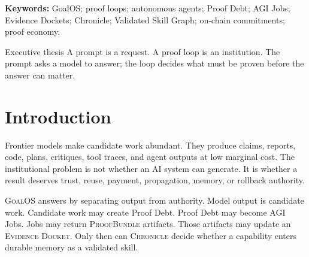 \documentclass[11pt]{article}
\newcommand{\doccode}[1]{\texttt{#1}}
\newcommand{\GoalOS}{\textsc{GoalOS}}
\newcommand{\Chronicle}{\textsc{Chronicle}}
\newcommand{\ProofBundle}{\textsc{ProofBundle}}
\newcommand{\EvidenceDocket}{\textsc{Evidence Docket}}
\begin{document}
\begin{abstract}
\noindent \doccode{PROOF\_LOOPS.md} specifies a compact operating law for proof-gated autonomous work: an objective becomes a proof mission; proof debt becomes AGI Jobs; jobs return evidence; evidence is gated by Chronicle; validated skills become graph memory; graph roots can be committed on-chain; and admitted skills improve future missions. This paper converts that operating note into a formal research architecture. It defines a state model, proof-debt mechanics, AGI Job contracts, Evidence Dockets, Chronicle admission, Validated Skill Graph accumulation, proof-level policy, on-chain commitment boundaries, and falsification tests. The central claim is architectural and testable: durable autonomy requires proof-carrying loops that prevent unverified output from becoming institutional memory. The paper does not claim achieved AGI, achieved ASI, legal certification, financial advice, production authorization, live settlement, or external validation. It defines the loop required for such claims to become inspectable, replayable, and governed.
\end{abstract}

\begin{center}
\small\textbf{Keywords:} GoalOS; proof loops; autonomous agents; Proof Debt; AGI Jobs; Evidence Dockets; Chronicle; Validated Skill Graph; on-chain commitments; proof economy.
\end{center}

\begin{lawbox}{Executive thesis}
A prompt is a request. A proof loop is an institution. The prompt asks a model to answer; the loop decides what must be proven before the answer can matter.
\end{lawbox}

\section{Introduction}
Frontier models make candidate work abundant. They produce claims, reports, code, plans, critiques, tool traces, and agent outputs at low marginal cost. The institutional problem is not whether an AI system can generate. It is whether a result deserves trust, reuse, payment, propagation, memory, or rollback authority.

\GoalOS{} answers by separating output from authority. Model output is candidate work. Candidate work may create Proof Debt. Proof Debt may become AGI Jobs. Jobs may return \ProofBundle{} artifacts. Those artifacts may update an \EvidenceDocket{}. Only then can \Chronicle{} decide whether a capability enters durable memory as a validated skill.
\end{document}
